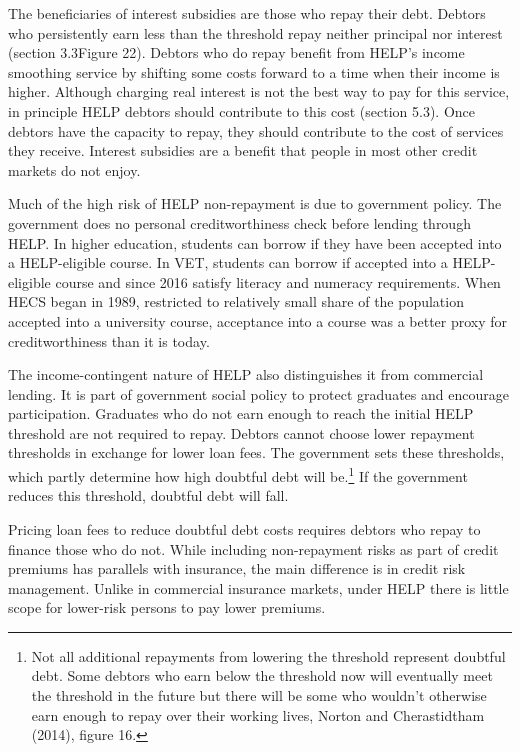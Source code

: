 \documentclass[]{book}
\begin{document}
The beneficiaries of interest subsidies are those who repay their debt. Debtors who persistently earn less than the threshold repay neither principal nor interest (section 3.3Figure 22). Debtors who do repay benefit from HELP's income smoothing service by shifting some costs forward to a time when their income is higher. Although charging real interest is not the best way to pay for this service, in principle HELP debtors should contribute to this cost (section 5.3). Once debtors have the capacity to repay, they should contribute to the cost of services they receive. Interest subsidies are a benefit that people in most other credit markets do not enjoy.

Much of the high risk of HELP non-repayment is due to government policy. The government does no personal creditworthiness check before lending through HELP. In higher education, students can borrow if they have been accepted into a HELP-eligible course. In VET, students can borrow if accepted into a HELP-eligible course and since 2016 satisfy literacy and numeracy requirements. When HECS began in 1989, restricted to relatively small share of the population accepted into a university course, acceptance into a course was a better proxy for creditworthiness than it is today.

The income-contingent nature of HELP also distinguishes it from commercial lending. It is part of government social policy to protect graduates and encourage participation. Graduates who do not earn enough to reach the initial HELP threshold are not required to repay. Debtors cannot choose lower repayment thresholds in exchange for lower loan fees. The government sets these thresholds, which partly determine how high doubtful debt will be.\footnote{Not all additional repayments from lowering the threshold represent doubtful debt. Some debtors who earn below the threshold now will eventually meet the threshold in the future but there will be some who wouldn't otherwise earn enough to repay over their working lives, Norton and Cherastidtham (2014), figure 16.} If the government reduces this threshold, doubtful debt will fall.

Pricing loan fees to reduce doubtful debt costs requires debtors who repay to finance those who do not. While including non-repayment risks as part of credit premiums has parallels with insurance, the main difference is in credit risk management. Unlike in commercial insurance markets, under HELP there is little scope for lower-risk persons to pay lower premiums.
\end{document}

